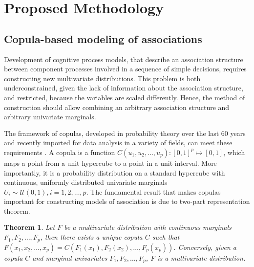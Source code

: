 \documentclass[12pt]{article}
\begin{document}
\section{Proposed Methodology}
\subsection{Copula-based modeling of associations}
	Development of cognitive process models, that describe an association structure between component processes involved in a sequence of simple decisions, requires constructing new multivariate distributions. This problem is both underconstrained, given the lack of information about the association structure, and restricted, because the variables are scaled differently. Hence, the method of construction should allow combining an arbitrary association structure and arbitrary univariate marginals. 
    
	The framework of copulas, developed in probability theory over the last 60 years and recently imported for data analysis in a variety of fields, can meet these requirements \citep{Skl1959,Joe1997,Nel2007,BerWoo2008}. A copula is a function $C(u_1, u_2, \dots, u_p): [0, 1]^p \mapsto [0, 1]$, which maps a point from a unit hypercube to a point in a unit interval. More importantly, it is a probability distribution on a standard hypercube with continuous, uniformly distributed univariate marginals $U_i \sim \mathcal{U}(0, 1), i = 1, 2, \dots, p$. The fundamental result that makes copulas important for constructing models of association is due to \citet{Skl1959} two-part representation theorem.
\newtheorem*{Sklar}{Theorem}
\begin{Sklar}
Let $F$ be a multivariate distribution with continuous marginals $F_1, F_2, \dots, F_p$, then there exists a unique copula $C$ such that $F(x_1, x_2, \dots, x_p) = C(F_1(x_1), F_2(x_2), \dots, F_p(x_p))$. Conversely, given a copula $C$ and marginal univariates $F_1, F_2, \dots, F_p$, F is a multivariate distribution. 
\end{Sklar}
\end{document}
